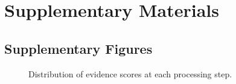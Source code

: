 \documentclass[
]{report}
\begin{document}
\hfill\break

\newpage{}

\section{Supplementary Materials}\label{supplementary-materials}

\subsection{Supplementary Figures}\label{supplementary-figures}

\begin{figure}[H]


\caption{\label{fig-evidence-histogramsD08295A6-16DC-499D-85A8-8BA656E013A2}Distribution
of evidence scores at each processing step.}

\end{figure}%
\end{document}
